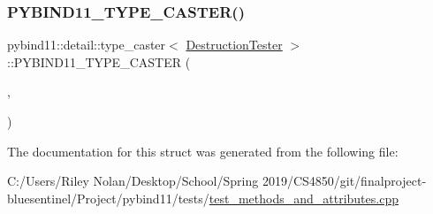 \subsubsection{\texorpdfstring{PYBIND11\_TYPE\_CASTER()}{PYBIND11\_TYPE\_CASTER()}}
{\footnotesize\ttfamily pybind11\+::detail\+::type\+\_\+caster$<$ \mbox{\hyperlink{class_destruction_tester}{Destruction\+Tester}} $>$\+::P\+Y\+B\+I\+N\+D11\+\_\+\+T\+Y\+P\+E\+\_\+\+C\+A\+S\+T\+ER (\begin{DoxyParamCaption}\item[{\mbox{\hyperlink{class_destruction_tester}{Destruction\+Tester}}}]{,  }\item[{\mbox{\hyperlink{descr_8h_af114703e20c6527e87163eb2798f74b8}{\+\_\+}}(\char`\"{}Destruction\+Tester\char`\"{})}]{ }\end{DoxyParamCaption})}



The documentation for this struct was generated from the following file\+:\begin{DoxyCompactItemize}
\item 
C\+:/\+Users/\+Riley Nolan/\+Desktop/\+School/\+Spring 2019/\+C\+S4850/git/finalproject-\/bluesentinel/\+Project/pybind11/tests/\mbox{\hyperlink{test__methods__and__attributes_8cpp}{test\+\_\+methods\+\_\+and\+\_\+attributes.\+cpp}}\end{DoxyCompactItemize}
